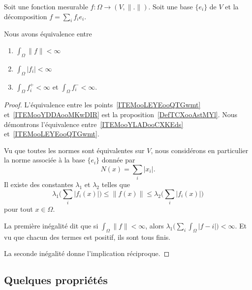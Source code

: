 \begin{proposition}     \label{PROPooNSCPooCMkrZl}
	Soit une fonction mesurable \( f\colon \Omega\to (V,\| . \|)\). Soit une base \( \{ e_i \}\) de \( V\) et la décomposition \( f=\sum_if_ie_i\).

	Nous avons équivalence entre
	\begin{enumerate}
		\item       \label{ITEMooYLADooCXKEds}
		      \( \int_{\Omega}\| f \|<\infty\)
		\item       \label{ITEMooLEYEooQTGwmt}
		      \( \int_{\Omega}| f_i |<\infty\)
		\item       \label{ITEMooYDDAooMKwDIR}
		      \( \int_{\Omega}f_i^+<\infty\) et \( \int_{\Omega}f_i^-<\infty\).
	\end{enumerate}
\end{proposition}

\begin{proof}
	L'équivalence entre les points~\ref{ITEMooLEYEooQTGwmt} et~\ref{ITEMooYDDAooMKwDIR} est la proposition~\ref{DefTCXooAstMYl}. Nous démontrons l'équivalence entre~\ref{ITEMooYLADooCXKEds} et~\ref{ITEMooLEYEooQTGwmt}.

	Vu que toutes les normes sont équivalentes sur \( V\), nous considérons en particulier la norme associée à la base \( \{ e_i \}\) donnée par
	\begin{equation}
		N(x)=\sum_i| x_i |.
	\end{equation}
	Il existe des constantes \( \lambda_1\) et \( \lambda_2\) telles que
	\begin{equation}
		\lambda_1\big( \sum_i| f_i(x) | \big)\leq \| f(x) \|\leq \lambda_2\big( \sum_i| f_i(x) | \big)
	\end{equation}
	pour tout \( x\in \Omega\).

	La première inégalité dit que si \( \int_{\Omega}\| f \|<\infty\), alors \( \lambda_1\big( \sum_i\int_{\Omega}| f-i | \big)<\infty\). Et vu que chacun des termes est positif, ils sont tous finis.

	La seconde inégalité donne l'implication réciproque.
\end{proof}

\subsection{Quelques propriétés}

